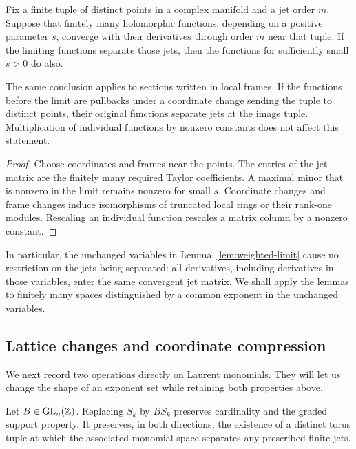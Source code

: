 \begin{lemma}\label{lem:rank-transfer}
Fix a finite tuple of distinct points in a complex manifold and a jet order
$m$. Suppose that finitely many holomorphic functions, depending on a
positive parameter $s$, converge with their derivatives through order $m$
near that tuple. If the limiting functions separate those jets, then the
functions for sufficiently small $s>0$ do also.

The same conclusion applies to sections written in local frames. If the
functions before the limit are pullbacks under a coordinate change sending
the tuple to distinct points, their original functions separate jets at the
image tuple. Multiplication of individual functions by nonzero constants
does not affect this statement.
\end{lemma}

\begin{proof}
Choose coordinates and frames near the points. The entries of the jet matrix
are the finitely many required Taylor coefficients. A maximal minor that is
nonzero in the limit remains nonzero for small $s$. Coordinate changes and
frame changes induce isomorphisms of truncated local rings or their
rank-one modules. Rescaling an individual function rescales a matrix column
by a nonzero constant.
\end{proof}

In particular, the unchanged variables in
Lemma~\ref{lem:weighted-limit} cause no restriction on the jets being
separated: all derivatives, including derivatives in those variables, enter
the same convergent jet matrix. We shall apply the lemmas to finitely many
spaces distinguished by a common exponent in the unchanged variables.

\subsection{Lattice changes and coordinate compression}

We next record two operations directly on Laurent monomials. They will let
us change the shape of an exponent set while retaining both properties
above.

\begin{lemma}\label{lem:unimodular}
Let $B\in\operatorname{GL}_n(\mathbb Z)$. Replacing $S_k$ by $BS_k$ preserves
cardinality and the graded support property. It preserves, in both
directions, the existence of a distinct torus tuple at which the associated
monomial space separates any prescribed finite jets.
\end{lemma}


